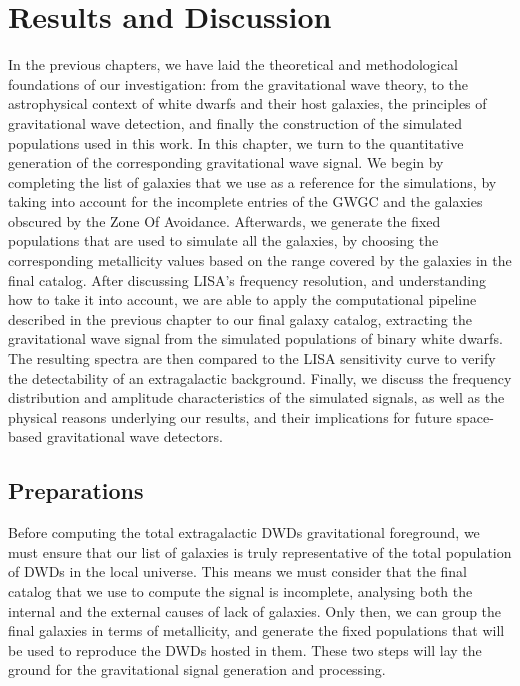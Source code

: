 \chapter{Results and Discussion}
In the previous chapters, we have laid the theoretical and methodological foundations of our investigation:  
from the gravitational wave theory, to the astrophysical context of white dwarfs and their host galaxies, the principles of gravitational wave detection, and finally the construction of the simulated populations used in this work.  
In this chapter, we turn to the quantitative generation of the corresponding gravitational wave signal.  
We begin by completing the list of galaxies that we use as a reference for the simulations, by taking into account for the incomplete entries of the GWGC and the galaxies obscured by the Zone Of Avoidance.
Afterwards, we generate the fixed populations that are used to simulate all the galaxies, by choosing the corresponding metallicity values based on the range covered by the galaxies in the final catalog.
After discussing LISA's frequency resolution, and understanding how to take it into account, we are able to apply the computational pipeline described in the previous chapter to our final galaxy catalog, extracting the gravitational wave signal from the simulated populations of binary white dwarfs.  
The resulting spectra are then compared to the LISA sensitivity curve to verify the detectability of an extragalactic background.  
Finally, we discuss the frequency distribution and amplitude characteristics of the simulated signals, as well as the physical reasons underlying our results, and their implications for future space-based gravitational wave detectors.


\section{Preparations}
Before computing the total extragalactic DWDs gravitational foreground, we must ensure that our list of galaxies is truly representative of the total population of DWDs in the local universe. 
This means we must consider that the final catalog that we use to compute the signal is incomplete, analysing both the internal and the external causes of lack of galaxies.
Only then, we can group the final galaxies in terms of metallicity, and generate the fixed populations that will be used to reproduce the DWDs hosted in them.
These two steps will lay the ground for the gravitational signal generation and processing.

